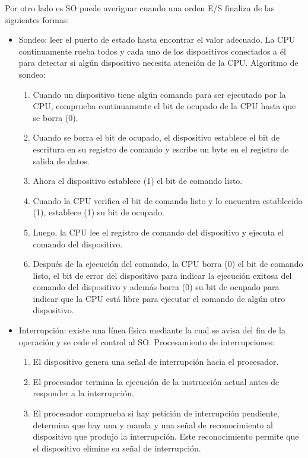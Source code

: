 \documentclass{article}
\begin{document}
Por otro lado es SO puede averiguar cuando una orden E/S finaliza de las siguientes formas:
\begin{itemize}
\item Sondeo: leer el puerto de estado hasta encontrar el valor adecuado. La CPU continuamente rueba todos y cada uno de los dispositivos conectados a él para detectar si algún dispositivo necesita atención de la CPU. Algoritmo de sondeo:
	\begin{enumerate}
	\item Cuando un dispositivo tiene algún comando para ser ejecutado por la CPU, comprueba continuamente el bit de ocupado de la CPU hasta que se borra (0).
	
	\item Cuando se borra el bit de ocupado, el dispositivo establece el bit de escritura en su registro de comando y escribe un byte en el registro de salida de datos.
	
	\item Ahora el dispositivo establece (1) el bit de comando listo.
	
	\item Cuando la CPU verifica el bit de comando listo y lo encuentra establecido (1), establece (1) su bit de ocupado.
	
	\item Luego, la CPU lee el registro de comando del dispositivo y ejecuta el comando del dispositivo.
	
	\item Después de la ejecución del comando, la CPU borra (0) el bit de comando listo, el bit de error del dispositivo para indicar la ejecución exitosa del comando del dispositivo y además borra (0) su bit de ocupado para indicar que la CPU está libre para ejecutar el comando de algún otro dispositivo.
	\end{enumerate}	 

\item Interrupción: existe una línea física mediante la cual se avisa del fin de la operación y se cede el control al SO. Procesamiento de interrupciones:
	\begin{enumerate}
	\item El dispositivo genera una señal de interrupción hacia el procesador.
	
	\item El procesador termina la ejecución de la instrucción actual antes de responder a la interrupción.
	
	\item El procesador comprueba si hay petición de interrupción pendiente, determina que hay una y manda y una señal de reconocimiento al dispositivo que produjo la interrupción. Este reconocimiento permite que el dispositivo elimine su señal de interrupción.
	

\end{enumerate}
\end{itemize}
\end{document}

